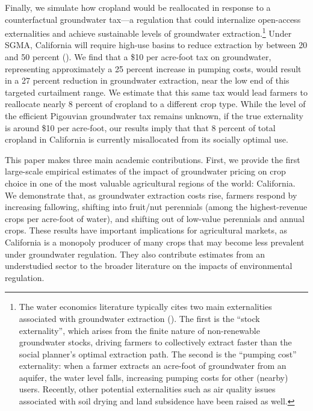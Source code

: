 Finally, we simulate how cropland would be reallocated in response to a counterfactual groundwater tax---a regulation that could internalize open-access externalities and achieve sustainable levels of groundwater extraction.\footnote{The water economics literature typically cites two main externalities associated with groundwater extraction (\textcite{provencher1993}). The first is the ``stock externality'', which arises from the finite nature of non-renewable groundwater stocks, driving farmers to collectively extract faster than the social planner's optimal extraction path. The second is the ``pumping cost'' externality: when a farmer extracts an acre-foot of groundwater from an aquifer, the water level falls, increasing pumping costs for other (nearby) users. Recently, other potential externalities such as air quality issues associated with soil drying and land subsidence have been raised as well.}  Under SGMA, California will require high-use basins to reduce extraction by between 20 and 50 percent (\textcite{bruno2019}). We find that a \$10 per acre-foot tax on groundwater, representing approximately a 25 percent increase in pumping costs, would result in a 27 percent reduction in groundwater extraction, near the low end of this targeted curtailment range. We estimate that this same tax would lead farmers to reallocate nearly 8 percent of cropland to a different crop type. While the level of the efficient Pigouvian groundwater tax remains unknown, if the true externality is around \$10 per acre-foot, our results imply that that 8 percent of total cropland in California is currently misallocated from its socially optimal use.


This paper makes three main academic contributions. First, we provide the first large-scale empirical estimates of the impact of groundwater pricing on crop choice in one of the most valuable agricultural regions of the world: California. We demonstrate that, as groundwater extraction costs rise, farmers respond by increasing fallowing, shifting into fruit/nut perennials (among the highest-revenue crops per acre-foot of water), and shifting out of low-value perennials and annual crops. These results have important implications for agricultural markets, as California is a monopoly producer of many crops that may become less prevalent under groundwater regulation. They also contribute estimates from an understudied sector to the broader literature on the impacts of environmental regulation.



